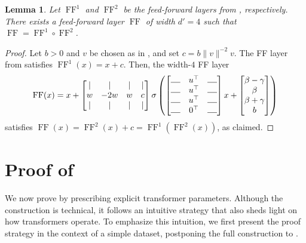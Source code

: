 \documentclass[pdflatex,sn-mathphys-num]{sn-jnl}%
\theoremstyle{thmstyleone}%
\newtheorem{lemma}[theorem]{Lemma}
\theoremstyle{thmstyletwo}%
\theoremstyle{thmstylethree}%
\numberwithin{equation}{section}
\DeclareMathOperator{\FF}{\mathrm{FF}}
\begin{document}
\begin{lemma}\label{lem:ff-combo-w4}
    Let $\FF^{1}$ and $\FF^{2}$ be the feed-forward layers from , respectively. There exists a feed-forward layer $\FF$ of width $d'=4$ such that $\FF = \FF^{1}\circ \FF^{2}$.
\end{lemma}
\begin{proof}
    Let $b>0$ and $v$ be chosen as in , and set $c=b \|v\|^{-2} v$. The FF layer from  satisfies $\FF^{1}(x)=x+c$. Then, the width-$4$ FF layer
    \begin{equation*}
    \mathrm{FF}(x) = x + \begin{bmatrix}
    \vert & \vert & \vert & \vert \\
    {w} & -2{w} & {w} & c \\
    \vert & \vert & \vert & \vert 
    \end{bmatrix} \sigma\left( \begin{bmatrix}
    \rule{0.4cm}{0.4pt} & {u^\top} & \rule{0.4cm}{0.4pt} \\
    \rule{0.4cm}{0.4pt} & {u^\top} & \rule{0.4cm}{0.4pt} \\
    \rule{0.4cm}{0.4pt} & {u^\top} & \rule{0.4cm}{0.4pt} \\
    \rule{0.4cm}{0.4pt} & {0^\top} & \rule{0.4cm}{0.4pt} \\
    \end{bmatrix} x + \begin{bmatrix}
        {\beta} - {\gamma} \\
        {\beta} \\
        {\beta} + {\gamma} \\
        b
    \end{bmatrix}\right)
    \end{equation*}
    satisfies $\FF(x)
    =\FF^{2}(x)+c
    =\FF^{1}(\FF^{2}(x))$, as claimed.
\end{proof}


\section{Proof of \texorpdfstring{}{Theorem \ref{thm:mainResult}}}\label{sec:proofOfMainResult}

We now prove  by prescribing explicit transformer parameters. 
Although the construction is technical, it follows an intuitive strategy that also sheds light on how transformers operate. To emphasize this intuition, we first present the proof strategy in the context of a simple dataset, postponing the full construction to .
\end{document}

